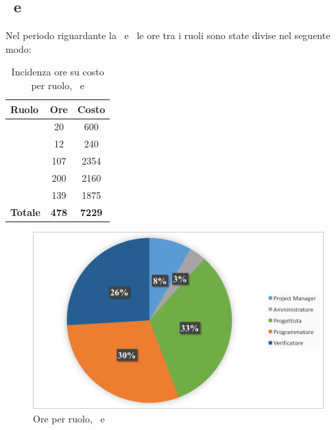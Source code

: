 \subsection{\PD\ e \COD}
Nel periodo riguardante la \PD\ e \COD\ le ore tra i ruoli sono state divise nel seguente modo:
\begin{table}[h]
	\begin{center}
		\begin{tabular}{|l|c|c|}
			\hline
			\textbf{Ruolo}	& \textbf{Ore} &	\textbf{Costo}	 \\
			\hline
			\Pm &	20 & 600\\
			\hline
			\Am	&	12 & 240\\
			\hline
			\Prog	&	107 & 2354\\
			\hline
			\Progr	&	200 & 2160\\
			\hline
			\Ver	&	139 & 1875\\
			\hline
			\textbf{Totale} &	 \textbf{478}	&	\textbf{7229}\\
			\hline
		\end{tabular}
	\end{center}
	\caption{Incidenza ore su costo per ruolo, \PD\ e \COD}
\end{table}

\begin{figure}[H]
	\centering 
	\includegraphics[scale=0.7]{Immagini/GraficiTorteSezione6/PDCOD.png}
	\caption{Ore per ruolo, \PD\ e \COD}
\end{figure}

